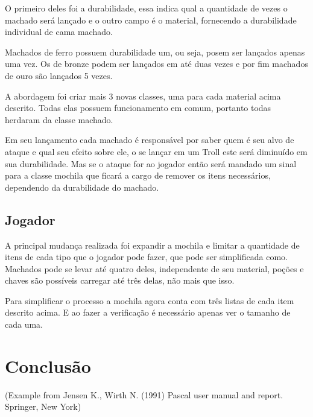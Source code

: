 \documentclass[runningheads,a4paper]{llncs}
\begin{document}
		O primeiro deles foi a durabilidade, essa indica qual a quantidade de vezes o machado será lançado e o outro campo é o material, fornecendo a durabilidade individual de cama machado.
		
		Machados de ferro possuem durabilidade um, ou seja, posem ser lançados apenas uma vez. Os de bronze podem ser lançados em até duas vezes e por fim machados de ouro são lançados 5 vezes.
		
		A abordagem foi criar mais 3 novas classes, uma para cada material acima descrito. Todas elas possuem funcionamento em comum, portanto todas herdaram da classe machado.
		
		Em seu lançamento cada machado é responsável por saber quem é seu alvo de ataque e qual seu efeito sobre ele, o se lançar em um Troll este será diminuído em sua durabilidade. Mas se o ataque for ao jogador então será mandado um sinal para a classe mochila que ficará a cargo de remover os itens necessários, dependendo da durabilidade do machado.
		
	\subsection{Jogador}
		A principal mudança realizada foi expandir a mochila e limitar a quantidade de itens de cada tipo que o jogador pode fazer, que pode ser simplificada como. Machados pode se levar até quatro deles, independente de seu material, poções e chaves são possíveis carregar até três delas, não mais que isso.
		
		Para simplificar o processo a mochila agora conta com três listas de cada item descrito acima. E ao fazer a verificação é necessário apenas ver o tamanho de cada uma.

\section{Conclusão}

{\small (Example from Jensen K., Wirth N. (1991) Pascal user manual and
report. Springer, New York)}


\nocite{*} 
\end{document}
